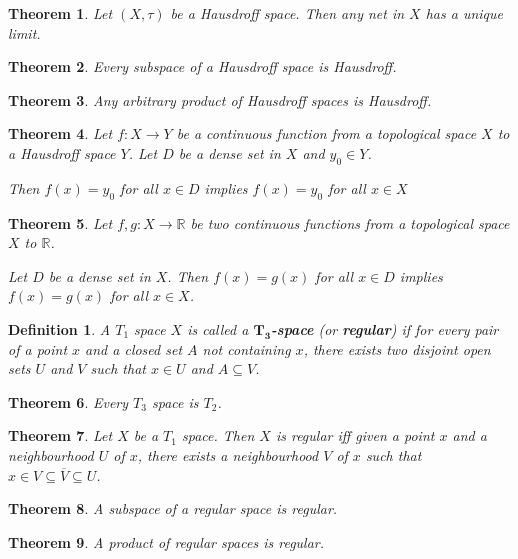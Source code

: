 \documentclass[14pt,twoside]{extreport}
\theoremstyle{dotless}
\newtheorem*{defn}{Definition}
\newtheorem*{thm}{Theorem} %
\begin{document}
\begin{thm}
    Let $(X,\tau)$ be a Hausdroff space. Then any net in $X$ has a unique limit.
\end{thm}

\begin{thm}
    Every subspace of a Hausdroff space is Hausdroff.
\end{thm}

\begin{thm}
    Any arbitrary product of Hausdroff spaces is Hausdroff.
\end{thm}

\begin{thm}
    Let $f: X \to Y$ be a continuous function from a topological space $X$ to a Hausdroff space $Y$. 
    Let $D$ be a dense set in $X$ and $y_0 \in Y$.

    Then $f(x) = y_0 $ for all $x \in D$ implies $f(x) = y_0$ for all $x \in X$ 
\end{thm}

\begin{thm}
    Let $f, g: X \to \mathbb{R}$ be two continuous functions from a topological space $X$ to $\mathbb{R}$.

    Let $D$ be a dense set in $X$. 
    Then $f(x) = g(x)$ for all $x \in D$ implies $f(x) = g(x)$ for all $x \in X$.
\end{thm}

\begin{defn}
    A $T_1$ space $X$ is called a \textbf{$\bm{T_3}$-space} (or \textbf{regular}) if for every pair of a point $x$ and a closed set $A$ not containing $x$, there exists two disjoint open sets $U$ and $V$ such that $x \in U$ and $A \subseteq V$.
\end{defn}

\begin{thm}
    Every $T_3$ space is $T_2$.
\end{thm}

\begin{thm}
    Let $X$ be a $T_1$ space. Then $X$ is regular iff given a point $x$ and a neighbourhood $U$ of $x$, there exists a neighbourhood $V$ of $x$ such that $x \in V \subseteq \overline{V} \subseteq U$.
\end{thm}

\begin{thm}
    A subspace of a regular space is regular.
\end{thm}

\begin{thm}
    A product of regular spaces is regular.
\end{thm}
\end{document}
